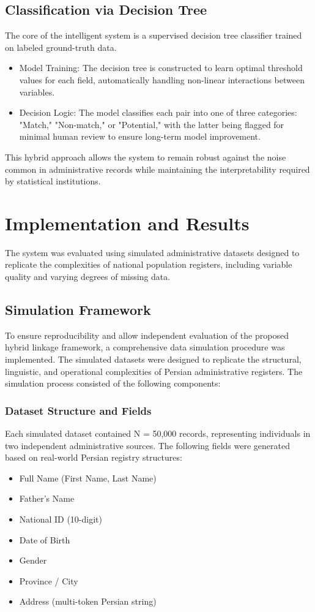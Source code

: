 \documentclass[twoside]{article}
\begin{document}
\subsection{Classification via Decision Tree}
The core of the intelligent system is a supervised decision tree classifier trained on labeled ground-truth data.
	\begin{itemize}
		\item 	Model Training: The decision tree is constructed to learn optimal threshold values for each field, automatically handling non-linear interactions between variables.
		\item 	Decision Logic: The model classifies each pair into one of three categories: "Match," "Non-match," or "Potential," with the latter being flagged for minimal human review to ensure long-term model improvement.
	\end{itemize}
This hybrid approach allows the system to remain robust against the noise common in administrative records while maintaining the interpretability required by statistical institutions.
\section{Implementation and Results}
The system was evaluated using simulated administrative datasets designed to replicate the complexities of national population registers, including variable quality and varying degrees of missing data.
\subsection{Simulation Framework}
To ensure reproducibility and allow independent evaluation of the proposed hybrid linkage framework, a comprehensive data simulation procedure was implemented. The simulated datasets were designed to replicate the structural, linguistic, and operational complexities of Persian administrative registers. The simulation process consisted of the following components:
\subsubsection{Dataset Structure and Fields}
Each simulated dataset contained N = 50,000 records, representing individuals in two independent administrative sources. The following fields were generated based on real-world Persian registry structures:
	\begin{itemize}
			\item 	Full Name (First Name, Last Name)
			\item   Father’s Name
			\item 	National ID (10-digit)
			\item	Date of Birth
			\item	Gender
			\item	Province / City
			\item	Address (multi-token Persian string)
	\end{itemize}
\newfontfamily{}
\end{document}
